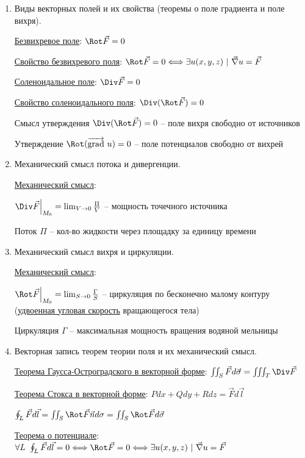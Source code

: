 \documentclass[12pt]{article}
\begin{document}
\begin{enumerate}
        \item Виды векторных полей и их свойства (теоремы о поле градиента и поле вихря).

        \hyperlink{vectorfieldtypes}{Безвихревое поле}: $\Rot \vec{F} = 0$

        \hyperlink{irrotationalfieldproperty}{Свойство безвихревого поля}: $\Rot \vec{F} = 0 \Longleftrightarrow \exists u(x, y, z) \ | \ \vec\nabla u = \vec{F}$

        \hyperlink{vectorfieldtypes}{Соленоидальное поле}: $\Div \vec{F} = 0$

        \hyperlink{solenoidalfieldproperty}{Свойство соленоидального поля}: $\Div (\Rot \vec{F}) = 0$

        Смысл утверждения $\Div (\Rot \vec F) = 0$ -- поле вихря свободно от источников

        Утверждение $\Rot (\overrightarrow{\operatorname{grad}}\ u) = 0$ -- поле потенциалов свободно от вихрей


        \item Механический смысл потока и дивергенции.

        \hyperlink{divergencemechanicalmeaning}{Механический смысл}:

        $\Div \vec{F} \Big|_{M_0} = \lim_{V \to 0} \frac{\Pi}{V}$ -- мощность точечного источника

        Поток $\Pi$ -- кол-во жидкости через площадку за единицу времени


        \item Механический смысл вихря и циркуляции.

        \hyperlink{rotormechanicalmeaning}{Механический смысл}:

        $\Rot \vec{F} \Big|_{M_0} = \lim_{S \to 0} \frac{\Gamma}{S}$ -- циркуляция по бесконечно малому контуру (\hyperlink{rotormechanicalmeaning2}{удвоенная угловая скорость} вращающегося тела)

        Циркуляция $\Gamma$ -- максимальная мощность вращения водяной мельницы

        \item Векторная запись теорем теории поля и их механический смысл.

        \hyperlink{gaussostrogradskyyvector}{Теорема Гаусса-Остроградского в векторной форме}: $\iint_S \vec{F} d\vec{\sigma} = \iiint_T \Div \vec{F}$

        \hyperlink{theoremGaussOstrogradskyyinvectorform}{Теорема Стокса в векторной форме}: $Pdx + Qdy + Rdz = \vec{F}d\vec{l}$

        $\oint_L \vec{F}d\vec{l} = \iint_S \Rot \vec{F} \vec{n} d\sigma = \iint_S \Rot \vec{F} d\vec{\sigma}$

        \hyperlink{theoremaboutpotentialinvectorform}{Теорема о потенциале}: $\forall L \ \oint_L \vec{F}d\vec{l} = 0 \Longleftrightarrow \Rot \vec{F} = 0 \Longleftrightarrow \exists u(x, y, z) \ | \ \vec\nabla u = \vec{F}$


    \end{enumerate}
\end{document}
